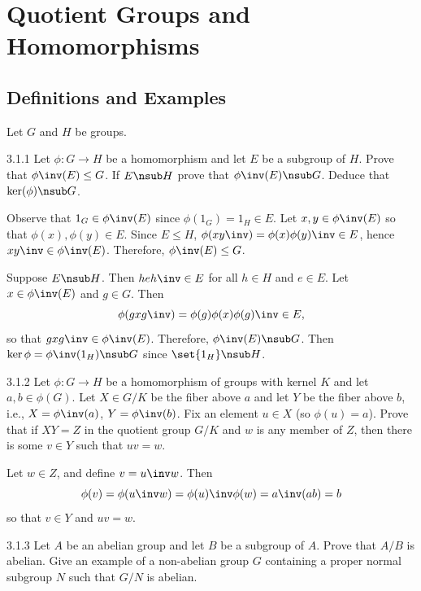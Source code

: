 \section{Quotient Groups and Homomorphisms}

\subsection{Definitions and Examples}

Let $G$ and $H$ be groups.

\begin{exercise}{3.1.1}
    Let $\phi \colon G \to H$ be a homomorphism and let $E$ be a subgroup of $H$.
	Prove that $\phi\inv(E) \leq G$.
	If $E \nsub H$ prove that $\phi\inv(E) \nsub G$.
	Deduce that $\ker(\phi) \nsub G$.
\end{exercise}

\begin{sol}
    Observe that $1_G \in \phi\inv(E)$ since $\phi(1_G) = 1_H \in E$.
	Let $x, y \in \phi\inv(E)$ so that $\phi(x), \phi(y) \in E$.
	Since $E \leq H$, $\phi(xy\inv) = \phi(x)\phi(y)\inv \in E$, hence $xy\inv \in \phi\inv(E)$.
	Therefore, $\phi\inv(E) \leq G$.

    Suppose $E \nsub H$.
	Then $heh\inv \in E$ for all $h \in H$ and $e \in E$.
	Let $x \in \phi\inv(E)$ and $g \in G$.
	Then
    \[
    	\phi(gxg\inv) = \phi(g)\phi(x)\phi(g)\inv \in E,
    \]
    so that $gxg\inv \in \phi\inv(E)$.
	Therefore, $\phi\inv(E) \nsub G$.
	Then $\ker \phi = \phi\inv(1_H) \nsub G$ since $\set{1_H} \nsub H$.
\end{sol}

\begin{exercise}{3.1.2}
    Let $\phi \colon G \to H$ be a homomorphism of groups with kernel $K$ and let $a,b \in \phi(G)$.
	Let $X \in G/K$ be the fiber above $a$ and let $Y$ be the fiber above $b$, i.e., $X = \phi\inv (a)$, $Y = \phi\inv (b)$.
	Fix an element $u \in X$ (so $\phi(u)=a$).
	Prove that if $XY = Z$ in the quotient group $G/K$ and $w$ is any member of $Z$, then there is some $v \in Y$ such that $uv = w$.
\end{exercise}

\begin{sol}
    Let $w \in Z$, and define $v = u\inv w$.
	Then
    \[
    	\phi(v) = \phi(u\inv w) = \phi(u)\inv \phi(w) = a\inv (ab) = b
    \]
    so that $v \in Y$ and $uv = w$.
\end{sol}

\begin{exercise}{3.1.3}
    Let $A$ be an abelian group and let $B$ be a subgroup of $A$.
	Prove that $A/B$ is abelian.
	Give an example of a non-abelian group $G$ containing a proper normal subgroup $N$ such that $G/N$ is abelian.
\end{exercise}

